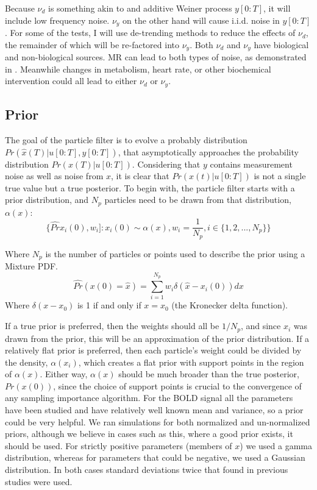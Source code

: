 Because $\nu_d$ is something akin to and additive Weiner process $y[0:T]$, it 
will include low frequency noise. $\nu_y$ on the other hand will cause i.i.d. noise
in $y[0:T]$. For some of the tests, I will use de-trending methods to reduce the effects of 
$\nu_d$, the remainder of which will be re-factored into $\nu_y$. Both $\nu_d$ and $\nu_y$
have biological and non-biological sources. MR can lead to both types of noise, 
as demonstrated in \cite{Smith1999}. Meanwhile changes in metabolism, heart rate, or
other biochemical intervention could all lead to either $\nu_d$ or $\nu_y$.

\subsection{Prior}

The goal of the particle filter is to evolve a probably distribution 
$Pr(\hat{x}(T) | u[0:T], y[0:T])$,
that asymptotically approaches the probability distribution $Pr(x(T) | u[0:T])$.
Considering that $y$ contains measurement noise as well as noise from $x$,
 it is clear that $Pr(x(t) | u[0:T])$ is not a single true value
but a true posterior. 
To begin with, the particle filter starts with a prior distribution, and $N_p$
particles need to be drawn from that distribution, $\alpha(x)$:
\begin{equation}
\{\hat{Pr}x_i(0),w_i] : x_i(0) \sim \alpha(x), w_i = \frac{1}{N_p}, i \in \{1, 2, ... , N_p\} \}
\end{equation}

Where $N_p$ is the number of particles or points used to describe the prior 
using a Mixture PDF. 
\begin{equation}
\hat{Pr}(x(0) = \hat{x}) = \sum_{i=1}^{N_p} w_i\delta(\hat{x} - x_i(0) ) dx
\end{equation}
Where $\delta(x-x_0)$ is 1 if and only if $x = x_0$ (the Kronecker delta function).

If a true prior is preferred, then the weights
should all be $1/N_p$, and since $x_i$ was drawn from the prior, this will
be an approximation of the prior distribution. If a relatively flat prior is 
preferred, then each particle's weight could be divided by the density, $\alpha(x_i)$,
which creates a flat prior with support points in the region of $\alpha(x)$. Either
way, $\alpha(x)$ should be much broader than the true posterior, $Pr(x(0))$, since the
choice of support points is crucial to the convergence of any sampling importance
algorithm. 
For the BOLD signal all the parameters have been studied and have relatively well
known mean and variance, so a prior could be very helpful. We ran simulations for
both normalized and un-normalized priors, although we believe in cases such as this,
where a good prior exists, it should be used. 
For strictly positive parameters (members of $x$) we used a gamma distribution,
whereas for parameters that could be negative, we used a Gaussian distribution. In
both cases standard deviations twice that found in previous studies were used.

